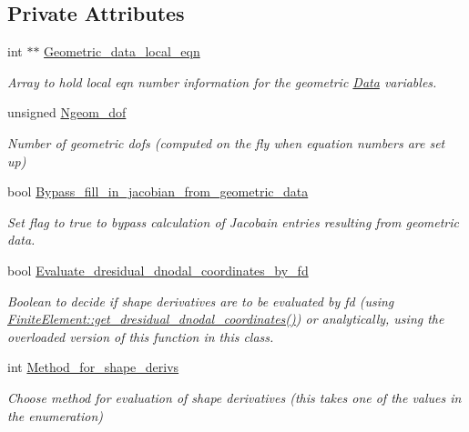 \subsection*{Private Attributes}
\begin{DoxyCompactItemize}
\item 
int $\ast$$\ast$ \hyperlink{classoomph_1_1ElementWithMovingNodes_ad4f650e53dab1492ef757ab5e69c66ff}{Geometric\+\_\+data\+\_\+local\+\_\+eqn}
\begin{DoxyCompactList}\small\item\em Array to hold local eqn number information for the geometric \hyperlink{classoomph_1_1Data}{Data} variables. \end{DoxyCompactList}\item 
unsigned \hyperlink{classoomph_1_1ElementWithMovingNodes_a346ca61cbdd374683a4fa1073a5f5dec}{Ngeom\+\_\+dof}
\begin{DoxyCompactList}\small\item\em Number of geometric dofs (computed on the fly when equation numbers are set up) \end{DoxyCompactList}\item 
bool \hyperlink{classoomph_1_1ElementWithMovingNodes_a69258bc20d31d8212f4096e46aa80b6b}{Bypass\+\_\+fill\+\_\+in\+\_\+jacobian\+\_\+from\+\_\+geometric\+\_\+data}
\begin{DoxyCompactList}\small\item\em Set flag to true to bypass calculation of Jacobain entries resulting from geometric data. \end{DoxyCompactList}\item 
bool \hyperlink{classoomph_1_1ElementWithMovingNodes_a48a91f84864bc2346ee4b9d50d2250b1}{Evaluate\+\_\+dresidual\+\_\+dnodal\+\_\+coordinates\+\_\+by\+\_\+fd}
\begin{DoxyCompactList}\small\item\em Boolean to decide if shape derivatives are to be evaluated by fd (using \hyperlink{classoomph_1_1FiniteElement_ae4b85a31a983a52d3010930f9e0851b8}{Finite\+Element\+::get\+\_\+dresidual\+\_\+dnodal\+\_\+coordinates()}) or analytically, using the overloaded version of this function in this class. \end{DoxyCompactList}\item 
int \hyperlink{classoomph_1_1ElementWithMovingNodes_a7b02491715adf7a315631938138362af}{Method\+\_\+for\+\_\+shape\+\_\+derivs}
\begin{DoxyCompactList}\small\item\em Choose method for evaluation of shape derivatives (this takes one of the values in the enumeration) \end{DoxyCompactList}\end{DoxyCompactItemize}
